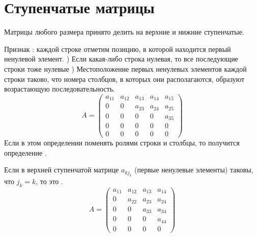 \section{Ступенчатые матрицы}
Матрицы любого размера принято делить на верхние и нижние ступенчатые.
\begin{opred}Признак :
 каждой строке отметим позицию, в которой находится первый ненулевой элемент.
) Если какая-либо строка нулевая, то все последующие строки тоже нулевые
) Местоположение первых ненулевых элементов каждой строки таково, что номера столбцов, в которых они располагаются, образуют возрастающую последовательность.
$$
A=\begin{pmatrix}
a_{11} & a_{12} & a_{13} & a_{14} & a_{15} \\
0      & 0      & a_{23} & a_{24} & a_{25} \\
0      & 0      & 0      & 0      & a_{35} \\
0      & 0      & 0      & 0      & 0      \\
0      & 0      & 0      & 0      & 0
\end{pmatrix}
$$
Если в этом определении поменять ролями строки и столбцы, то получится определение .

Если в верхней ступенчатой матрице $a_{kj_k}$ (первые ненулевые элементы) таковы, что $j_k=k$, то это .
$$
A=\begin{pmatrix}
a_{11} & a_{12} & a_{13} & a_{14} \\
0      & a_{22} & a_{23} & a_{24} \\
0      & 0      & a_{33} & a_{34} \\
0      & 0      & 0      & a_{44} \\
0      & 0      & 0      & 0
\end{pmatrix}
$$
\end{opred}
